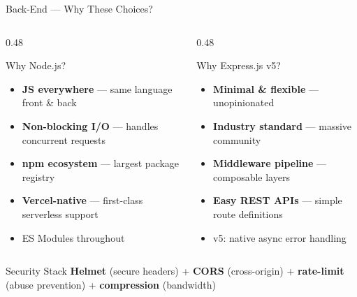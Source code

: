 \documentclass[aspectratio=169, 12pt]{beamer}
\begin{document}
\begin{frame}{Back-End --- Why These Choices?}

\begin{columns}[T]
\begin{column}{0.48\textwidth}
\begin{block}{Why Node.js?}
\begin{itemize}\itemsep=2pt
    \item \textbf{JS everywhere} --- same language front \& back
    \item \textbf{Non-blocking I/O} --- handles concurrent requests
    \item \textbf{npm ecosystem} --- largest package registry
    \item \textbf{Vercel-native} --- first-class serverless support
    \item ES Modules throughout
\end{itemize}
\end{block}
\end{column}
\begin{column}{0.48\textwidth}
\begin{block}{Why Express.js v5?}
\begin{itemize}\itemsep=2pt
    \item \textbf{Minimal \& flexible} --- unopinionated
    \item \textbf{Industry standard} --- massive community
    \item \textbf{Middleware pipeline} --- composable layers
    \item \textbf{Easy REST APIs} --- simple route definitions
    \item v5: native async error handling
\end{itemize}
\end{block}
\end{column}
\end{columns}

\vspace{8pt}
\begin{block}{Security Stack}
\textbf{Helmet} (secure headers) + \textbf{CORS} (cross-origin) + \textbf{rate-limit} (abuse prevention) + \textbf{compression} (bandwidth)
\end{block}
\end{frame}
\end{document}

